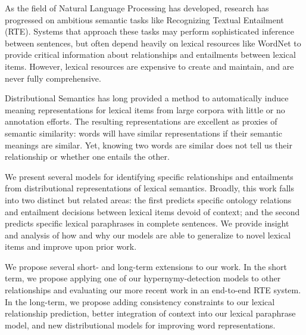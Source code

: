 As the field of Natural Language Processing has developed, research has
progressed on ambitious semantic tasks like Recognizing Textual Entailment
(RTE). Systems that approach these tasks may perform sophisticated
inference between sentences, but often depend heavily on lexical resources
like WordNet to provide critical information about relationships and
entailments between lexical items. However, lexical resources are expensive
to create and maintain, and are never fully comprehensive.

Distributional Semantics has long provided a method to automatically induce
meaning representations for lexical items from large corpora with little or
no annotation efforts. The resulting representations are excellent
as proxies of semantic similarity: words will have similar representations if
their semantic meanings are similar. Yet, knowing two words are similar
does not tell us their relationship or whether one entails the other.

We present several models for identifying specific relationships and
entailments from distributional representations of lexical semantics.
Broadly, this work falls into two distinct but related areas: the first
predicts specific ontology relations and entailment decisions between
lexical items devoid of context; and the second predicts specific lexical
paraphrases in complete sentences. We provide insight and analysis of how and
why our models are able to generalize to novel lexical items and
improve upon prior work.

We propose several short- and long-term extensions to our work. In the
short term, we propose applying one of our hypernymy-detection models to
other relationships and evaluating our more recent work in an end-to-end
RTE system. In the long-term, we propose adding consistency constraints to
our lexical relationship prediction, better integration of context into
our lexical paraphrase model, and new distributional models for improving
word representations.

